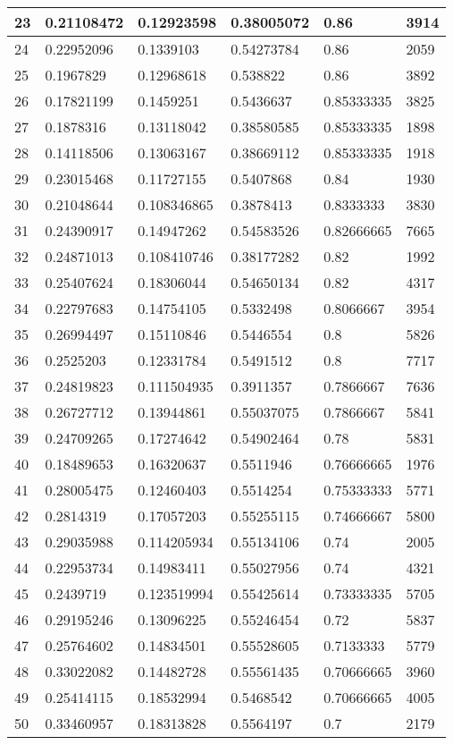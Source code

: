 \begin{longtable}{|l|l|l|l|l|l|}
23 & 0.21108472 & 0.12923598 & 0.38005072 & 0.86 & 3914 \\ \hline 
24 & 0.22952096 & 0.1339103 & 0.54273784 & 0.86 & 2059 \\ \hline 
25 & 0.1967829 & 0.12968618 & 0.538822 & 0.86 & 3892 \\ \hline 
26 & 0.17821199 & 0.1459251 & 0.5436637 & 0.85333335 & 3825 \\ \hline 
27 & 0.1878316 & 0.13118042 & 0.38580585 & 0.85333335 & 1898 \\ \hline 
28 & 0.14118506 & 0.13063167 & 0.38669112 & 0.85333335 & 1918 \\ \hline 
29 & 0.23015468 & 0.11727155 & 0.5407868 & 0.84 & 1930 \\ \hline 
30 & 0.21048644 & 0.108346865 & 0.3878413 & 0.8333333 & 3830 \\ \hline 
31 & 0.24390917 & 0.14947262 & 0.54583526 & 0.82666665 & 7665 \\ \hline 
32 & 0.24871013 & 0.108410746 & 0.38177282 & 0.82 & 1992 \\ \hline 
33 & 0.25407624 & 0.18306044 & 0.54650134 & 0.82 & 4317 \\ \hline 
34 & 0.22797683 & 0.14754105 & 0.5332498 & 0.8066667 & 3954 \\ \hline 
35 & 0.26994497 & 0.15110846 & 0.5446554 & 0.8 & 5826 \\ \hline 
36 & 0.2525203 & 0.12331784 & 0.5491512 & 0.8 & 7717 \\ \hline 
37 & 0.24819823 & 0.111504935 & 0.3911357 & 0.7866667 & 7636 \\ \hline 
38 & 0.26727712 & 0.13944861 & 0.55037075 & 0.7866667 & 5841 \\ \hline 
39 & 0.24709265 & 0.17274642 & 0.54902464 & 0.78 & 5831 \\ \hline 
40 & 0.18489653 & 0.16320637 & 0.5511946 & 0.76666665 & 1976 \\ \hline 
41 & 0.28005475 & 0.12460403 & 0.5514254 & 0.75333333 & 5771 \\ \hline 
42 & 0.2814319 & 0.17057203 & 0.55255115 & 0.74666667 & 5800 \\ \hline 
43 & 0.29035988 & 0.114205934 & 0.55134106 & 0.74 & 2005 \\ \hline 
44 & 0.22953734 & 0.14983411 & 0.55027956 & 0.74 & 4321 \\ \hline 
45 & 0.2439719 & 0.123519994 & 0.55425614 & 0.73333335 & 5705 \\ \hline 
46 & 0.29195246 & 0.13096225 & 0.55246454 & 0.72 & 5837 \\ \hline 
47 & 0.25764602 & 0.14834501 & 0.55528605 & 0.7133333 & 5779 \\ \hline 
48 & 0.33022082 & 0.14482728 & 0.55561435 & 0.70666665 & 3960 \\ \hline 
49 & 0.25414115 & 0.18532994 & 0.5468542 & 0.70666665 & 4005 \\ \hline 
50 & 0.33460957 & 0.18313828 & 0.5564197 & 0.7 & 2179 \\ \hline 
\end{longtable}